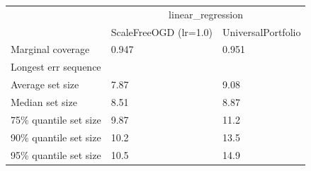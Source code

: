 \begin{tabular}{lll}
\toprule
& \multicolumn{2}{c}{linear_regression} \\
& ScaleFreeOGD (lr=1.0) & UniversalPortfolio \\
\midrule
Marginal coverage & 0.947 & 0.951 \\
Longest err sequence &  &  \\
Average set size & 7.87 & 9.08 \\
Median set size & 8.51 & 8.87 \\
75\% quantile set size & 9.87 & 11.2 \\
90\% quantile set size & 10.2 & 13.5 \\
95\% quantile set size & 10.5 & 14.9 \\
\bottomrule
\end{tabular}
